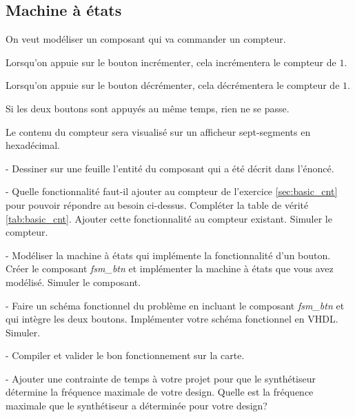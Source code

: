 \subsection{Machine à états}
On veut modéliser un composant qui va commander un compteur.

Lorsqu'on appuie sur le bouton incrémenter, cela incrémentera le compteur de $1$.

Lorsqu'on appuie sur le bouton décrémenter, cela décrémentera le compteur de $1$.

Si les deux boutons sont appuyés au même temps, rien ne se passe.

Le contenu du compteur sera visualisé sur un afficheur sept-segments en hexadécimal.

\medskip

- Dessiner sur une feuille l’entité du composant qui a été décrit dans l'énoncé.

\medskip

- Quelle fonctionnalité faut-il ajouter au compteur de l’exercice \ref{sec:basic_cnt} pour pouvoir répondre au besoin ci-dessus. Compléter la table de vérité \ref{tab:basic_cnt}. Ajouter cette fonctionnalité au compteur existant. Simuler le compteur.

\medskip

- Modéliser la machine à états qui implémente la fonctionnalité d'un bouton. Créer le composant \textit{fsm\_btn} et implémenter la machine à états que vous avez modélisé. Simuler le composant.

\medskip

- Faire un schéma fonctionnel du problème en incluant le composant \textit{fsm\_btn} et qui intègre les deux boutons. Implémenter votre schéma fonctionnel en VHDL. Simuler.

\medskip

- Compiler et valider le bon fonctionnement sur la carte.

\medskip

- Ajouter une contrainte de temps à votre projet pour que le synthétiseur détermine la fréquence maximale de votre design. Quelle est la fréquence maximale que le synthétiseur a déterminée pour votre design?
